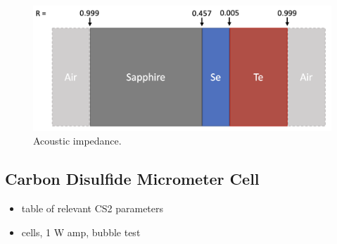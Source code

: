 \begin{figure}[t]
  \centering
  \includegraphics[width=.8\textwidth]{figs/4-Raman/AcousticImpedance.png}
  \caption{Acoustic impedance.}
  \label{fig:Raman:AcousticImpedance}
\end{figure}

\subsection{Carbon Disulfide Micrometer Cell}
\label{subsec:Raman:Target:CS2Cells}

\begin{itemize}
  \item table of relevant CS2 parameters
  \item cells, 1 W amp, bubble test
\end{itemize}

